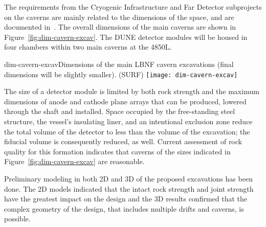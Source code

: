 The requirements from the Cryogenic Infrastructure and Far Detector subprojects on the caverns are mainly related to the dimensions of the space, and are documented in~\cite{dune-sci-req}.  The overall dimensions of the main caverns are shown in Figure~\ref{fig:dim-cavern-excav}. The DUNE detector modules will be housed in four chambers within two main caverns at the 4850L. 

\begin{cdrfigure}{dim-cavern-excav}{Dimensions of the main LBNF cavern excavations (final dimensions will be slightly smaller). (SURF) }
\texttt{[image: dim-cavern-excav]} 
\end{cdrfigure}

The size %
of a detector module is limited by both rock strength and the maximum dimensions of %
anode and cathode plane arrays that can be produced, lowered through the shaft and installed. Space occupied by the free-standing steel structure, the vessel's insulating liner, and an intentional exclusion zone reduce the total volume of the detector to less than the volume of the excavation; the fiducial volume is consequently reduced, as well. 
Current assessment of rock quality  for this formation indicates that caverns of the sizes indicated in Figure~\ref{fig:dim-cavern-excav} are reasonable. %

Preliminary modeling in both 2D and 3D of the proposed excavations has been done. %
The 2D models indicated that the intact rock strength and joint strength have the greatest impact on the design 
and the 3D results confirmed that the complex geometry of the design, that includes multiple drifts and caverns, is possible. 

